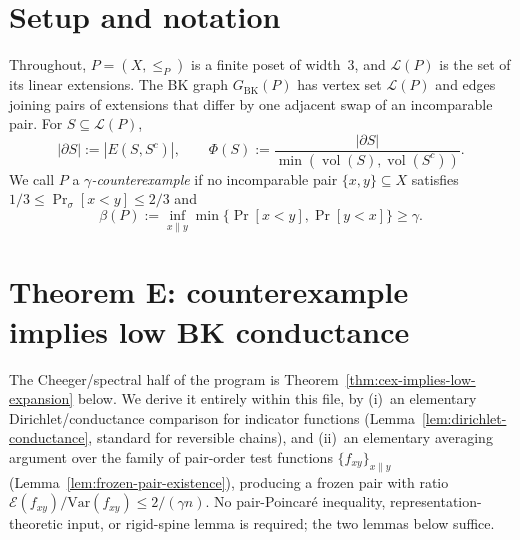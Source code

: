 
\begin{abstract}
Step 8 is the final assembly. It contains no new combinatorial content:
every case branch produced by Steps 1--7 is terminated by a contradiction
or by the direct production of a balanced pair. The job of this section
is to name, in one place, the glue lemmas needed and to chain the outputs
of Steps 2, 5, 6, and 7 into a proof of the main theorem. The
Cheeger-style ``counterexample $\Rightarrow$ low BK expansion''
theorem (Theorem~E), once labelled an external input, is now proved
in full inside this file (Section~\ref{sec:G1}) via a Dirichlet
comparison plus an elementary averaging argument on pair functions,
so Step~8 depends only on sealed outputs of Steps 1--7.

Several named lemmas cited below are proved elsewhere (Steps 1--7).
Five items live in Step 8 itself (Theorem~E and G2--G5); each is
discharged in its own section below.
\end{abstract}

\section{Setup and notation}

Throughout, $P = (X, \le_P)$ is a finite poset of width~$3$, and
$\mathcal{L}(P)$ is the set of its linear extensions. The BK graph
$G_{\mathrm{BK}}(P)$ has vertex set $\mathcal{L}(P)$ and edges joining
pairs of extensions that differ by one adjacent swap of an incomparable
pair. For $S \subseteq \mathcal{L}(P)$,
\[
  |\partial S| := |E(S, S^c)|,\qquad
  \Phi(S) := \frac{|\partial S|}{\min(\operatorname{vol}(S), \operatorname{vol}(S^c))}.
\]
We call $P$ a \emph{$\gamma$-counterexample} if no incomparable pair
$\{x,y\}\subseteq X$ satisfies $1/3 \le \Pr_\sigma[x < y] \le 2/3$ and
\[
  \beta(P) := \inf_{x\parallel y}\min\{\Pr[x<y],\Pr[y<x]\}\ge \gamma.
\]

\section{Theorem E: counterexample implies low BK conductance}
\label{sec:G1}

The Cheeger/spectral half of the program is
Theorem~\ref{thm:cex-implies-low-expansion} below. We derive it
entirely within this file, by (i)~an elementary Dirichlet/conductance
comparison for indicator functions (Lemma~\ref{lem:dirichlet-conductance},
standard for reversible chains), and (ii)~an elementary averaging
argument over the family of pair-order test functions
$\{f_{xy}\}_{x \parallel y}$ (Lemma~\ref{lem:frozen-pair-existence}),
producing a frozen pair with ratio
$\mathcal E(f_{xy})/\mathrm{Var}(f_{xy}) \le 2/(\gamma n)$. No
pair-Poincar\'e inequality, representation-theoretic input, or
rigid-spine lemma is required; the two lemmas below suffice.

